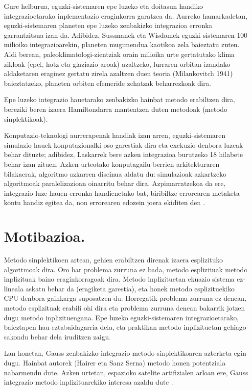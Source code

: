Gure helburua, eguzki-sistemaren epe luzeko eta doitasun handiko integrazioetarako inplementazio eraginkorra garatzea da. Aurreko hamarkadetan, eguzki-sistemaren planeten epe luzeko zenbakizko integrazioa erronka garrantzitsua izan da. Adibidez, Sussmanek eta Wisdomek  eguzki sistemaren 100 milioiko integrazioarekin, planeten mugimendua kaotikoa zela baieztatu zuten. Aldi berean, paleoklimatologi-zientziak orain milioika urte gertatutako klima zikloak (epel, hotz eta glaziazio aroak) azaltzeko, lurraren orbitan izandako aldaketaren eraginez gertatu zirela azaltzen duen teoria (Milankovitch 1941) \cite{Berger2012} baieztatzeko, planeten orbiten efemeride zehatzak beharrezkoak dira.        

Epe luzeko integrazio hauetarako zenbakizko hainbat metodo erabiltzen dira, bereziki beren izaera Hamiltondarra mantentzen duten metodoak (metodo sinplektikoak).

Konputazio-teknologi aurrerapenak handiak izan arren, eguzki-sistemaren simulazio hauek konputazionalki oso garestiak dira eta exekuzio denbora luzeak behar dituzte; adibidez, Laskarrek  bere azken integrazioa burutzeko 18 hilabete behar izan zituen.
Azken urteotako konputagailu berrien arkitekturaren bilakaerak, algoritmo azkarren diseinua aldatu du: simulazioak azkartzeko algoritmoak paralelizazioan oinarritu behar dira. Azpimarratzekoa da ere, integrazio luze hauen erronka handienetako bat, biribiltze errorearen metaketa kontu handiz egitea da, non errorearen edozein joera ekiditen den \cite{Laskar2015}.
 

\section{Motibazioa.}
\label{intro}


Metodo sinplektikoen artean, gehien erabiltzen direnak izaera esplizituko algoritmoak dira. Oro har problema zurruna ez bada, metodo esplizituak  metodo inplizituak baino eraginkorragoak dira. Metodo inplizituetan ekuazio sistema ez-lineala askatu behar da (eragiketa garestia), eta honek metodo esplizituekiko CPU denbora gainkarga suposatzen du. Horregatik problema zurruna ez denean, metodo esplizituak erabili ohi dira eta problema zurruna denean bakarrik jotzen dugu metodo inplizituengana. Epe luzeko eguzki-sistemaren integrazioetarako, baieztapen hau eztabaidagarria dela, eta praktikan metodo inplizituetan gehiago sakondu behar dela iruditzen zaigu. 

Lan honetan, Gauss zenbakizko integrazio metodo sinplektikoaren azterketa egin dugu. Hainbat autorek (Hairer \cite{Hairer2006}\cite{Hairer2008} eta Sanz Serna\cite{JMSanz-Serna1994}) metodo honen potentziala nabarmendu dute. Azken urtetan, espazioko satelite artifizialen arloan ere, Gauss integrazio metodo inplizituarekiko interesa azaldu dute \cite{Bradley2014}\cite{Beylkin2014}. 

